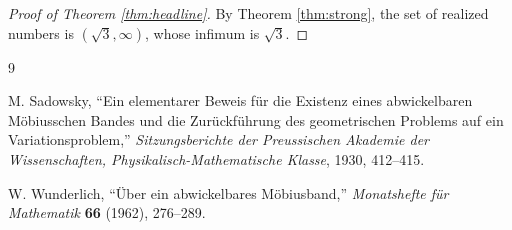 \documentclass[12pt]{article}
\theoremstyle{plain}
\begin{document}
\begin{proof}[Proof of Theorem \ref{thm:headline}]
By Theorem \ref{thm:strong}, the set of realized numbers is
\((\sqrt3,\infty)\), whose infimum is \(\sqrt3\).
\end{proof}

\begin{thebibliography}{9}

M. Sadowsky,
``Ein elementarer Beweis f\"ur die Existenz eines abwickelbaren M\"obiusschen
Bandes und die Zur\"uckf\"uhrung des geometrischen Problems auf ein
Variationsproblem,''
\emph{Sitzungsberichte der Preussischen Akademie der Wissenschaften,
Physikalisch-Mathematische Klasse},
1930, 412--415.

W. Wunderlich,
``\"Uber ein abwickelbares M\"obiusband,''
\emph{Monatshefte f\"ur Mathematik} \textbf{66} (1962), 276--289.

\end{thebibliography}
\end{document}
